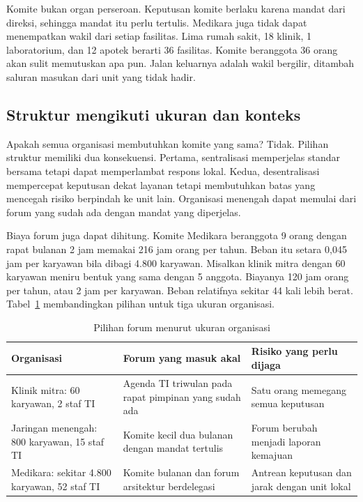 Komite bukan organ perseroan. Keputusan komite berlaku karena mandat dari direksi, sehingga
mandat itu perlu tertulis. Medikara juga tidak dapat menempatkan wakil dari setiap fasilitas.
Lima rumah sakit, 18 klinik, 1 laboratorium, dan 12 apotek berarti 36 fasilitas. Komite
beranggota 36 orang akan sulit memutuskan apa pun. Jalan keluarnya adalah wakil bergilir,
ditambah saluran masukan dari unit yang tidak hadir.

\subsection*{Struktur mengikuti ukuran dan konteks}

Apakah semua organisasi membutuhkan komite yang sama? Tidak. Pilihan struktur memiliki dua
konsekuensi. Pertama, sentralisasi memperjelas standar bersama tetapi dapat memperlambat
respons lokal. Kedua, desentralisasi mempercepat keputusan dekat layanan tetapi membutuhkan
batas yang mencegah risiko berpindah ke unit lain. Organisasi menengah dapat memulai dari
forum yang sudah ada dengan mandat yang diperjelas.

Biaya forum juga dapat dihitung. Komite Medikara beranggota 9 orang dengan rapat bulanan 2
jam memakai 216 jam orang per tahun. Beban itu setara 0,045 jam per karyawan bila dibagi 4.800
karyawan. Misalkan klinik mitra dengan 60 karyawan meniru bentuk yang sama dengan 5 anggota.
Biayanya 120 jam orang per tahun, atau 2 jam per karyawan. Beban relatifnya sekitar 44 kali
lebih berat. Tabel~\ref{tab:ch02-ukuran} membandingkan pilihan untuk tiga ukuran organisasi.

\begin{table}[!htb]
  \centering\small
  \caption{Pilihan forum menurut ukuran organisasi}\label{tab:ch02-ukuran}
  \begin{tabularx}{\textwidth}{|>{\raggedright\arraybackslash}p{}|>{\raggedright\arraybackslash}X|>{\raggedright\arraybackslash}X|}
    \hline
    \textbf{Organisasi} & \textbf{Forum yang masuk akal} & \textbf{Risiko yang perlu dijaga}
    \\ \hline
    Klinik mitra: 60 karyawan, 2 staf TI & Agenda TI triwulan pada rapat pimpinan yang sudah
    ada & Satu orang memegang semua keputusan \\ \hline
    Jaringan menengah: 800 karyawan, 15 staf TI & Komite kecil dua bulanan dengan mandat
    tertulis & Forum berubah menjadi laporan kemajuan \\ \hline
    Medikara: sekitar 4.800 karyawan, 52 staf TI & Komite bulanan dan forum arsitektur
    berdelegasi & Antrean keputusan dan jarak dengan unit lokal \\ \hline
  \end{tabularx}
\end{table}

